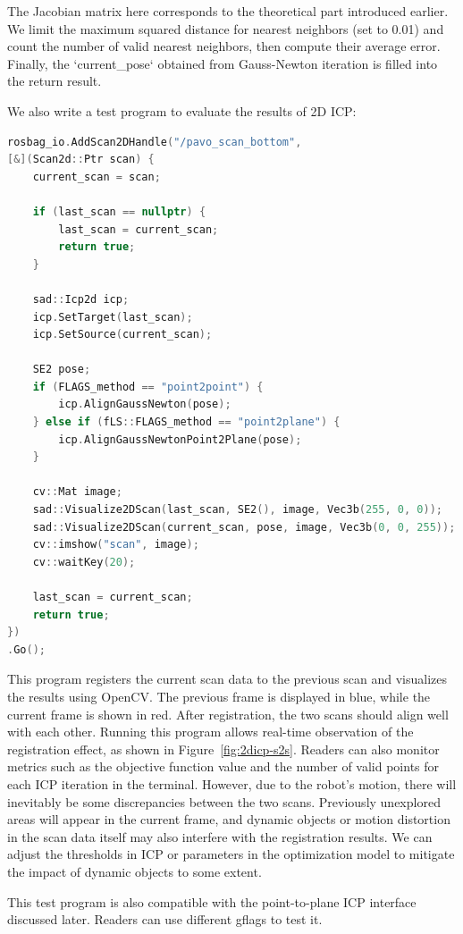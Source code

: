 The Jacobian matrix here corresponds to the theoretical part introduced earlier. We limit the maximum squared distance for nearest neighbors (set to 0.01) and count the number of valid nearest neighbors, then compute their average error. Finally, the `current_pose` obtained from Gauss-Newton iteration is filled into the return result.

We also write a test program to evaluate the results of 2D ICP:

\begin{lstlisting}[language=c++,caption=src/ch6/test\_2d\_icp\_s2s.cc]
rosbag_io.AddScan2DHandle("/pavo_scan_bottom",
[&](Scan2d::Ptr scan) {
	current_scan = scan;
	
	if (last_scan == nullptr) {
		last_scan = current_scan;
		return true;
	}
	
	sad::Icp2d icp;
	icp.SetTarget(last_scan);
	icp.SetSource(current_scan);
	
	SE2 pose;
	if (FLAGS_method == "point2point") {
		icp.AlignGaussNewton(pose);
	} else if (fLS::FLAGS_method == "point2plane") {
		icp.AlignGaussNewtonPoint2Plane(pose);
	}
	
	cv::Mat image;
	sad::Visualize2DScan(last_scan, SE2(), image, Vec3b(255, 0, 0));    // target in blue
	sad::Visualize2DScan(current_scan, pose, image, Vec3b(0, 0, 255));  // source in red
	cv::imshow("scan", image);
	cv::waitKey(20);
	
	last_scan = current_scan;
	return true;
})
.Go();
\end{lstlisting}

This program registers the current scan data to the previous scan and visualizes the results using OpenCV. The previous frame is displayed in blue, while the current frame is shown in red. After registration, the two scans should align well with each other. Running this program allows real-time observation of the registration effect, as shown in Figure~\ref{fig:2dicp-s2s}. Readers can also monitor metrics such as the objective function value and the number of valid points for each ICP iteration in the terminal. However, due to the robot's motion, there will inevitably be some discrepancies between the two scans. Previously unexplored areas will appear in the current frame, and dynamic objects or motion distortion in the scan data itself may also interfere with the registration results. We can adjust the thresholds in ICP or parameters in the optimization model to mitigate the impact of dynamic objects to some extent.

This test program is also compatible with the point-to-plane ICP interface discussed later. Readers can use different gflags to test it.

